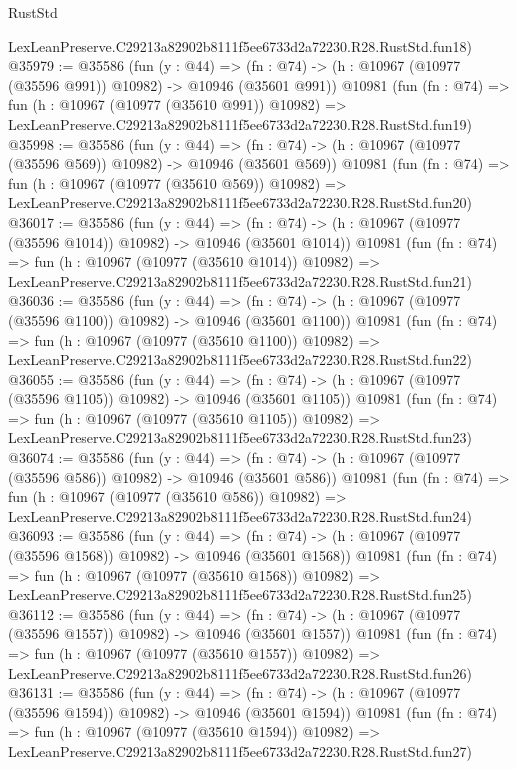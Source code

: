 \begin{lexlean}{RustStd}
\begin{coremodule}
    LexLeanPreserve.C29213a82902b8111f5ee6733d2a72230.R28.RustStd.fun18)
@35979 := @35586
    (fun (y : @44) =>
    (fn : @74) -> (h : @10967 (@10977 (@35596 @991)) @10982) -> @10946 (@35601 @991))
    @10981
    (fun (fn : @74) =>
    fun (h : @10967 (@10977 (@35610 @991)) @10982) =>
    LexLeanPreserve.C29213a82902b8111f5ee6733d2a72230.R28.RustStd.fun19)
@35998 := @35586
    (fun (y : @44) =>
    (fn : @74) -> (h : @10967 (@10977 (@35596 @569)) @10982) -> @10946 (@35601 @569))
    @10981
    (fun (fn : @74) =>
    fun (h : @10967 (@10977 (@35610 @569)) @10982) =>
    LexLeanPreserve.C29213a82902b8111f5ee6733d2a72230.R28.RustStd.fun20)
@36017 := @35586
    (fun (y : @44) =>
    (fn : @74) -> (h : @10967 (@10977 (@35596 @1014)) @10982) -> @10946 (@35601 @1014))
    @10981
    (fun (fn : @74) =>
    fun (h : @10967 (@10977 (@35610 @1014)) @10982) =>
    LexLeanPreserve.C29213a82902b8111f5ee6733d2a72230.R28.RustStd.fun21)
@36036 := @35586
    (fun (y : @44) =>
    (fn : @74) -> (h : @10967 (@10977 (@35596 @1100)) @10982) -> @10946 (@35601 @1100))
    @10981
    (fun (fn : @74) =>
    fun (h : @10967 (@10977 (@35610 @1100)) @10982) =>
    LexLeanPreserve.C29213a82902b8111f5ee6733d2a72230.R28.RustStd.fun22)
@36055 := @35586
    (fun (y : @44) =>
    (fn : @74) -> (h : @10967 (@10977 (@35596 @1105)) @10982) -> @10946 (@35601 @1105))
    @10981
    (fun (fn : @74) =>
    fun (h : @10967 (@10977 (@35610 @1105)) @10982) =>
    LexLeanPreserve.C29213a82902b8111f5ee6733d2a72230.R28.RustStd.fun23)
@36074 := @35586
    (fun (y : @44) =>
    (fn : @74) -> (h : @10967 (@10977 (@35596 @586)) @10982) -> @10946 (@35601 @586))
    @10981
    (fun (fn : @74) =>
    fun (h : @10967 (@10977 (@35610 @586)) @10982) =>
    LexLeanPreserve.C29213a82902b8111f5ee6733d2a72230.R28.RustStd.fun24)
@36093 := @35586
    (fun (y : @44) =>
    (fn : @74) -> (h : @10967 (@10977 (@35596 @1568)) @10982) -> @10946 (@35601 @1568))
    @10981
    (fun (fn : @74) =>
    fun (h : @10967 (@10977 (@35610 @1568)) @10982) =>
    LexLeanPreserve.C29213a82902b8111f5ee6733d2a72230.R28.RustStd.fun25)
@36112 := @35586
    (fun (y : @44) =>
    (fn : @74) -> (h : @10967 (@10977 (@35596 @1557)) @10982) -> @10946 (@35601 @1557))
    @10981
    (fun (fn : @74) =>
    fun (h : @10967 (@10977 (@35610 @1557)) @10982) =>
    LexLeanPreserve.C29213a82902b8111f5ee6733d2a72230.R28.RustStd.fun26)
@36131 := @35586
    (fun (y : @44) =>
    (fn : @74) -> (h : @10967 (@10977 (@35596 @1594)) @10982) -> @10946 (@35601 @1594))
    @10981
    (fun (fn : @74) =>
    fun (h : @10967 (@10977 (@35610 @1594)) @10982) =>
    LexLeanPreserve.C29213a82902b8111f5ee6733d2a72230.R28.RustStd.fun27)

\end{coremodule}
\end{lexlean}

